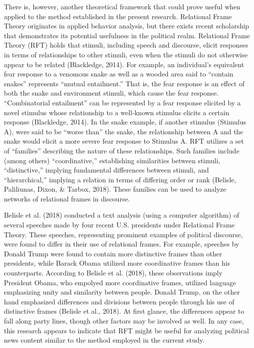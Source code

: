 \documentclass[english,,man]{apa6}
\begin{document}
There is, however, another theoretical framework that could prove useful
when applied to the method established in the present research.
Relational Frame Theory originates in applied behavior analysis, but
there exists recent scholarship that demonstrates its potential
usefulness in the political realm. Relational Frame Theory (RFT) holds
that stimuli, including speech and discourse, elicit responses in terms
of relationships to other stimuli, even when the stimuli do not
otherwise appear to be related (Blackledge, 2014). For example, an
individual's equivalent fear response to a venomous snake as well as a
wooded area said to \enquote{contain snakes} represents \enquote{mutual
entailment.} That is, the fear response is an effect of both the snake
and environment stimuli, which cause the fear response.
\enquote{Combinatorial entailment} can be represented by a fear response
elicited by a novel stimulus whose relationship to a well-known stimulus
elicits a certain response (Blackledge, 2014). In the snake example, if
another stimulus (Stimulus A), were said to be \enquote{worse than} the
snake, the relationship between A and the snake would elicit a more
severe fear response to Stimulus A. RFT utilizes a set of
\enquote{families} describing the nature of these relationships. Such
families include (among others) \enquote{coordinative,} establishing
similarities between stimuli, \enquote{distinctive,} implying
fundamental differences between stimuli, and \enquote{hierarchical,}
implying a relation in terms of differing order or rank (Belisle,
Paliliunas, Dixon, \& Tarbox, 2018). These families can be used to
analyze networks of relational frames in discourse.

Belisle et al. (2018) conducted a text analysis (using a computer
algorithm) of several speeches made by four recent U.S. presidents under
Relational Frame Theory. These speeches, representing prominent examples
of political discourse, were found to differ in their use of relational
frames. For example, speeches by Donald Trump were found to contain more
distinctive frames than other presidents, while Barack Obama utilized
more coordinative frames than his counterparts. According to Belisle et
al. (2018), these observations imply President Obama, who empolyed more
coordinative frames, utilized language emphasizing unity and similarity
between people. Donald Trump, on the other hand emphasized differences
and divisions between people through his use of distinctive frames
(Belisle et al., 2018). At first glance, the differences appear to fall
along party lines, though other factors may be involved as well. In any
case, this research appears to indicate that RFT might be useful for
analyzing political news content similar to the method employed in the
current study.
\end{document}
